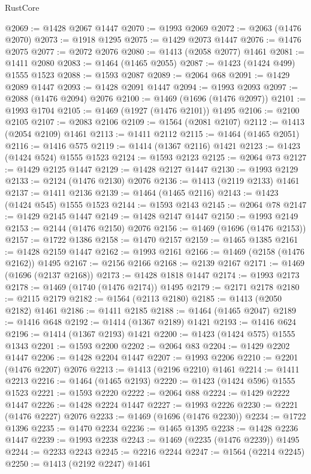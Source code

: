 \begin{lexlean}{RustCore}
\begin{coremodule}
@2069 := @1428 @2067 @1447
@2070 := @1993 @2069
@2072 := @2063 (@1476 @2070)
@2073 := @1918 @1295
@2075 := @1429 @2073 @1447
@2076 := @1476 @2075
@2077 := @2072 @2076
@2080 := @1413 (@2058 @2077) @1461
@2081 := @1411 @2080
@2083 := @1464 (@1465 @2055)
@2087 := @1423 (@1424 @499) @1555 @1523
@2088 := @1593 @2087
@2089 := @2064 @68
@2091 := @1429 @2089 @1447
@2093 := @1428 @2091 @1447
@2094 := @1993 @2093
@2097 := @2088 (@1476 @2094) @2076
@2100 := @1469 (@1696 (@1476 @2097))
@2101 := @1993 @1704
@2105 := @1469 (@1927 (@1476 @2101)) @1495
@2106 := @2100 @2105
@2107 := @2083 @2106
@2109 := @1564 (@2081 @2107)
@2112 := @1413 (@2054 @2109) @1461
@2113 := @1411 @2112
@2115 := @1464 (@1465 @2051)
@2116 := @1416 @575
@2119 := @1414 (@1367 @2116) @1421
@2123 := @1423 (@1424 @524) @1555 @1523
@2124 := @1593 @2123
@2125 := @2064 @73
@2127 := @1429 @2125 @1447
@2129 := @1428 @2127 @1447
@2130 := @1993 @2129
@2133 := @2124 (@1476 @2130) @2076
@2136 := @1413 (@2119 @2133) @1461
@2137 := @1411 @2136
@2139 := @1464 (@1465 @2116)
@2143 := @1423 (@1424 @545) @1555 @1523
@2144 := @1593 @2143
@2145 := @2064 @78
@2147 := @1429 @2145 @1447
@2149 := @1428 @2147 @1447
@2150 := @1993 @2149
@2153 := @2144 (@1476 @2150) @2076
@2156 := @1469 (@1696 (@1476 @2153))
@2157 := @1722 @1386
@2158 := @1470 @2157
@2159 := @1465 @1385
@2161 := @1428 @2159 @1447
@2162 := @1993 @2161
@2166 := @1469 (@2158 (@1476 @2162)) @1495
@2167 := @2156 @2166
@2168 := @2139 @2167
@2171 := @1469 (@1696 (@2137 @2168))
@2173 := @1428 @1818 @1447
@2174 := @1993 @2173
@2178 := @1469 (@1740 (@1476 @2174)) @1495
@2179 := @2171 @2178
@2180 := @2115 @2179
@2182 := @1564 (@2113 @2180)
@2185 := @1413 (@2050 @2182) @1461
@2186 := @1411 @2185
@2188 := @1464 (@1465 @2047)
@2189 := @1416 @648
@2192 := @1414 (@1367 @2189) @1421
@2193 := @1416 @624
@2196 := @1414 (@1367 @2193) @1421
@2200 := @1423 (@1424 @575) @1555 @1343
@2201 := @1593 @2200
@2202 := @2064 @83
@2204 := @1429 @2202 @1447
@2206 := @1428 @2204 @1447
@2207 := @1993 @2206
@2210 := @2201 (@1476 @2207) @2076
@2213 := @1413 (@2196 @2210) @1461
@2214 := @1411 @2213
@2216 := @1464 (@1465 @2193)
@2220 := @1423 (@1424 @596) @1555 @1523
@2221 := @1593 @2220
@2222 := @2064 @88
@2224 := @1429 @2222 @1447
@2226 := @1428 @2224 @1447
@2227 := @1993 @2226
@2230 := @2221 (@1476 @2227) @2076
@2233 := @1469 (@1696 (@1476 @2230))
@2234 := @1722 @1396
@2235 := @1470 @2234
@2236 := @1465 @1395
@2238 := @1428 @2236 @1447
@2239 := @1993 @2238
@2243 := @1469 (@2235 (@1476 @2239)) @1495
@2244 := @2233 @2243
@2245 := @2216 @2244
@2247 := @1564 (@2214 @2245)
@2250 := @1413 (@2192 @2247) @1461

\end{coremodule}
\end{lexlean}
